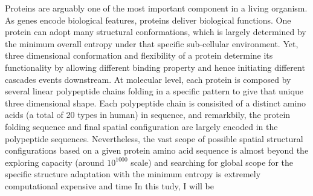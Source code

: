 Proteins are arguably one of the most important component in a living organism. As genes encode biological features, proteins deliver biological functions. One protein can adopt many structural conformations, which is largely determined by the minimum overall entropy under that specific sub-cellular environment. Yet, three dimensional conformation and flexibility of a protein determine its functionality by allowing different binding property and hence initiating different cascades events downstream. At molecular level, each protein is composed by several linear polypeptide chains folding in a specific pattern to give that unique three dimensional shape. Each polypeptide chain is consisited of a distinct amino acids (a total of 20 types in human) in sequence, and remarkbily, the protein folding sequence and final spatial configuration are largely encoded in the polypeptide sequences. Nevertheless, the vast scope of possible spatial structural configurations based on a given protein amino acid sequence is almost beyond the exploring capacity (around $10^{1000}$ scale) and searching for global scope for the specific structure adaptation with the minimum entropy is extremely computational expensive and time  In this tudy, I will be 